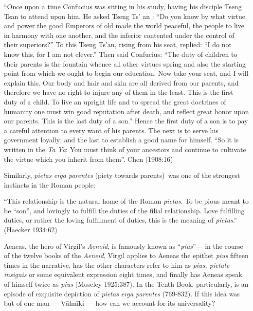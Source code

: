 \begin{myquote}
“Once upon a time Confucius was sitting in his study, having his disciple Tseng Tsan to attend upon him. He asked Tseng Ts' an : “Do you know by what virtue and power the good Emperors of old made the world peaceful, the people to live in harmony with one another, and the inferior contented under the control of their superiors?” To this Tseng Ts'an, rising from his seat, replied: “I do not know this, for I am not clever.” Then said Confucius: “The duty of children to their parents is the fountain whence all other virtues spring and also the starting point from which we ought to begin our education. Now take your seat, and I will explain this. Our body and hair and skin are all derived from our parents, and therefore we have no right to injure any of them in the least. This is the first duty of a child. To live an upright life and to spread the great doctrines of humanity one must win good reputation after death, and reflect great honor upon our parents. This is the last duty of a son.” Hence the first duty of a son is to pay a careful attention to every want of his parents. The next is to serve his government loyally; and the last to establish a good name for himself. “So it is written in the {\sl Ta Ya}: You must think of your ancestors and continue to cultivate the virtue which you inherit from them”.
\hfill Chen (1908:16)	 
\end{myquote}

Similarly, {\sl pietas erga parentes} (piety towards parents) was one of the strongest instincts in the Roman people:  

\begin{myquote}
“This relationship is the natural home of the Roman {\sl pietas}. To be pious meant to be “son”, and lovingly to fulfill the duties of the filial relationship. Love fulfilling duties, or rather the loving fulfillment of duties, this is the meaning of {\sl pietas}.”
\hfill (Haecker 1934:62)
\end{myquote}

\newpage

Aeneas, the hero of Virgil’s {\sl Aeneid}, is famously known as “{\sl pius}”--- in the course of the twelve books of the {\sl Aeneid}, Virgil applies to Aeneas the epithet {\sl pius} fifteen times in the narrative, has the other characters refer to him as {\sl pius, pietate insignis} or some equivalent expression eight times, and finally has Aeneas speak of himself twice as {\sl pius} (Moseley 1925:387). In the Tenth Book, particularly, is an episode of exquisite depiction of {\sl pietas erga parentes} (769-832). If this idea was but of one man --- Vālmīki --- how can we account for its universality? 

